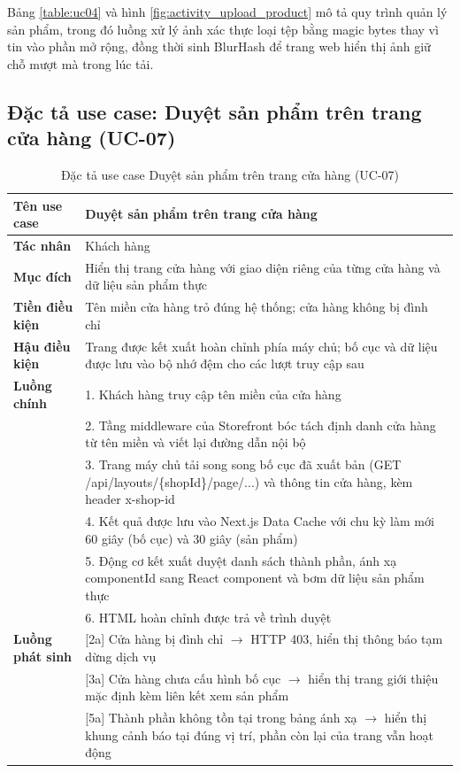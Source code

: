 \documentclass[../main.tex]{subfiles}
\begin{document}
Bảng \ref{table:uc04} và hình \ref{fig:activity_upload_product} mô tả quy trình quản lý sản phẩm, trong đó luồng xử lý ảnh xác thực loại tệp bằng magic bytes thay vì tin vào phần mở rộng, đồng thời sinh BlurHash để trang web hiển thị ảnh giữ chỗ mượt mà trong lúc tải.

\subsection{Đặc tả use case: Duyệt sản phẩm trên trang cửa hàng (UC-07)}
\label{subsection:2.3.4}

\begin{table}[H]
\centering
\begin{tabulary}{\textwidth}{|p{3cm}|L|}
  \hline
  \textbf{Tên use case} & Duyệt sản phẩm trên trang cửa hàng \\ \hline
  \textbf{Tác nhân} & Khách hàng \\ \hline
  \textbf{Mục đích} & Hiển thị trang cửa hàng với giao diện riêng của từng cửa hàng và dữ liệu sản phẩm thực \\ \hline
  \textbf{Tiền điều kiện} & Tên miền cửa hàng trỏ đúng hệ thống; cửa hàng không bị đình chỉ \\ \hline
  \textbf{Hậu điều kiện} & Trang được kết xuất hoàn chỉnh phía máy chủ; bố cục và dữ liệu được lưu vào bộ nhớ đệm cho các lượt truy cập sau \\ \hline
  \textbf{Luồng chính} &
    1. Khách hàng truy cập tên miền của cửa hàng \\
    & 2. Tầng middleware của Storefront bóc tách định danh cửa hàng từ tên miền và viết lại đường dẫn nội bộ \\
    & 3. Trang máy chủ tải song song bố cục đã xuất bản (GET /api/layouts/\{shopId\}/page/...) và thông tin cửa hàng, kèm header x-shop-id \\
    & 4. Kết quả được lưu vào Next.js Data Cache với chu kỳ làm mới 60 giây (bố cục) và 30 giây (sản phẩm) \\
    & 5. Động cơ kết xuất duyệt danh sách thành phần, ánh xạ componentId sang React component và bơm dữ liệu sản phẩm thực \\
    & 6. HTML hoàn chỉnh được trả về trình duyệt \\ \hline
  \textbf{Luồng phát sinh} &
    {[2a]} Cửa hàng bị đình chỉ $\rightarrow$ HTTP 403, hiển thị thông báo tạm dừng dịch vụ \\
    & {[3a]} Cửa hàng chưa cấu hình bố cục $\rightarrow$ hiển thị trang giới thiệu mặc định kèm liên kết xem sản phẩm \\
    & {[5a]} Thành phần không tồn tại trong bảng ánh xạ $\rightarrow$ hiển thị khung cảnh báo tại đúng vị trí, phần còn lại của trang vẫn hoạt động \\ \hline
\end{tabulary}
\caption{Đặc tả use case Duyệt sản phẩm trên trang cửa hàng (UC-07)}
\label{table:uc07}
\end{table}
\end{document}
